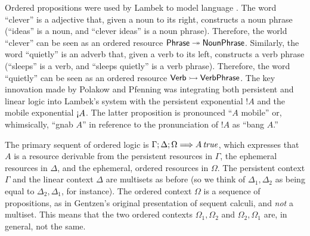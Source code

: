 Ordered propositions were used by Lambek to model language
\cite{lambek58mathematics}. The word ``clever'' is a adjective that,
given a noun to its right, constructs a noun phrase (``ideas''
is a noun, and ``clever ideas'' is a noun phrase). Therefore, the world
``clever'' can be seen as an ordered resource ${\sf Phrase \twoheadrightarrow
  NounPhrase}$. Similarly, the word ``quietly'' is an adverb that,
given a verb to its left, constructs a verb phrase (``sleeps''
is a verb, and ``sleeps quietly'' is a verb phrase). Therefore, the word
``quietly'' can be seen as an ordered resource ${\sf Verb \rightarrowtail
  VerbPhrase}$. The key innovation made by Polakow and Pfenning was
integrating both persistent and linear logic into Lambek's system with
the persistent exponential ${!}A$ and the mobile exponential
${\gnab}A$. The latter proposition is pronounced ``$A$ mobile'' or,
whimsically, ``gnab $A$'' in reference to the pronunciation of ${!}A$
as ``bang $A$.''
 
The primary sequent of ordered logic is
${\Gamma};{\Delta};{\Omega} \Longrightarrow {{A}\,{{\it true}}} \mathstrut$, which expresses that $A$
is a resource derivable from the persistent resources in $\Gamma$,
the ephemeral resources in $\Delta$, and the ephemeral, ordered
resources in $\Omega$. The persistent context $\Gamma$ and the linear
context $\Delta$ are multisets as before (so we think of $\Delta_1,
\Delta_2$ as being equal to $\Delta_2, \Delta_1$, for instance). The
ordered context $\Omega$ is a sequence of propositions, as in
Gentzen's original presentation of sequent calculi, and {\it not} a
multiset.  This means that the two ordered contexts $\Omega_1,
\Omega_2$ and $\Omega_2, \Omega_1$ are, in general, not the same.



